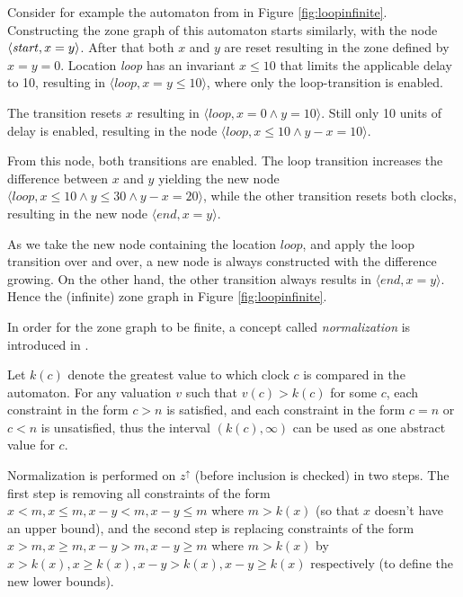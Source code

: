 \begin{example}

Consider for example the automaton from \cite{bengtsson2004timed} in Figure \ref{fig:loopinfinite}.
Constructing the zone graph of this automaton starts similarly, with the node $\langle \text{\emph{start}}, x=y \rangle$. After that both $x$ and $y$ are reset resulting in the zone defined by $x=y=0$. Location \emph{loop} has an invariant $x \leq 10$ that limits the applicable delay to 10, resulting in $\langle loop, x=y \leq 10 \rangle$, where only the loop-transition is enabled.

The transition resets $x$ resulting in $\langle loop, x=0 \wedge y=10 \rangle$. Still only 10 units of delay is enabled, resulting in the node $\langle loop, x \leq 10 \wedge y-x=10 \rangle$.

From this node, both transitions are enabled. The loop transition increases the difference between $x$ and $y$ yielding the new node $\langle loop, x \leq 10 \wedge y \leq 30 \wedge y-x=20 \rangle$, while the other transition resets both clocks, resulting in the new node $\langle end, x=y \rangle$.

As we take the new node containing the location $loop$, and apply the loop transition over and over, a new node is always constructed with the difference growing. On the other hand, the other transition always results in $\langle end, x=y \rangle$.
Hence the (infinite) zone graph in Figure \ref{fig:loopinfinite}.

\end{example}

In order for the zone graph to be finite, a concept called \emph{normalization} is introduced in \cite{bengtsson2004timed}.

Let $k(c)$ denote the greatest value to which clock $c$ is compared in the automaton.
For any valuation $v$ such that $v(c)>k(c)$ for some $c$, each constraint in the form $c > n$ is satisfied, and each constraint in the form $c = n$ or $c < n$ is unsatisfied, thus the interval $(k(c),\infty)$ can be used as one abstract value for $c$. 

Normalization is performed on $z^\uparrow$ (before inclusion is checked) in two steps. The first step is removing all constraints of the form $x < m, x \leq m, x-y <m, x-y\leq m$ where $m>k(x)$ (so that $x$ doesn't have an upper bound), and the second step is replacing constraints of the form $x > m, x \geq m, x-y >m, x-y\geq m$ where $m>k(x)$ by $x > k(x), x \geq k(x), x-y >k(x), x-y\geq k(x)$ respectively (to define the new lower bounds).

